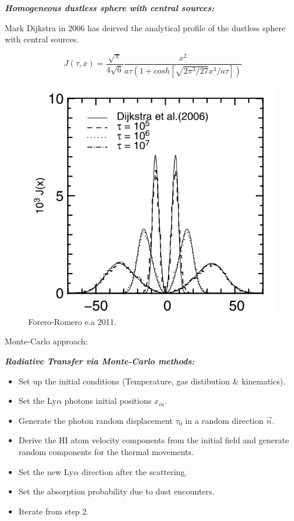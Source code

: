 \documentclass{beamer}
\begin{document}
\begin{frame}{\textit{\textbf{Homogeneous dustless sphere with central sources:}}}

Mark Dijkstra in 2006 has deirved the analytical profile of the dustless sphere with 
central sources. 

\begin{equation}
J(\tau, x) = \dfrac{\sqrt{\pi}}{4 \sqrt{6}} \dfrac{x^2}{a \tau (1 + cosh[\sqrt{2\pi^3/27}x^3 / a\tau])}
\end{equation}

\begin{figure}
\includegraphics[scale=0.2]{Figures/sphere.png}
\caption*{Forero-Romero e.a 2011.}
\end{figure}
\end{frame}

\begin{frame}
\LARGE{Monte-Carlo approach:}
\end{frame}

\begin{frame}{\textit{\textbf{Radiative Transfer via Monte-Carlo methods:}}}
\begin{itemize}
\item Set up the initial conditions (Temperature, gas distibution \& kinematics).
\item Set the Ly$\alpha$ photons initial positions $x_{in}$.
\item Generate the photon random displacement $\tau_0$ in a random direction
$\vec{n}$.
\item Derive the HI atom velocity components from the initial field and
generate random components for the thermal movements.
\item Set the new Ly$\alpha$ direction after the scattering.
\item Set the absorption probability due to dust encounters.
\item Iterate from step 2.
\end{itemize}
\end{frame}
\end{document}
